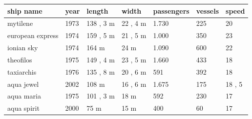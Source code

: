 \documentclass{article}
\begin{document}
\begin{tabular}{lllllll}
\toprule
ship name & year & length & width & passengers & vessels & speed \\
\midrule
mytilene & 1973 & 138 , 3 m & 22 , 4 m & 1.730 & 225 & 20 \\
european express & 1974 & 159 , 5 m & 21 , 5 m & 1.000 & 350 & 23 \\
ionian sky & 1974 & 164 m & 24 m & 1.090 & 600 & 22 \\
theofilos & 1975 & 149 , 4 m & 23 , 5 m & 1.660 & 433 & 18 \\
taxiarchis & 1976 & 135 , 8 m & 20 , 6 m & 591 & 392 & 18 \\
aqua jewel & 2002 & 108 m & 16 , 6 m & 1.675 & 175 & 18 , 5 \\
aqua maria & 1975 & 101 , 3 m & 18 m & 592 & 230 & 17 \\
aqua spirit & 2000 & 75 m & 15 m & 400 & 60 & 17 \\
\bottomrule
\end{tabular}
\end{document}
